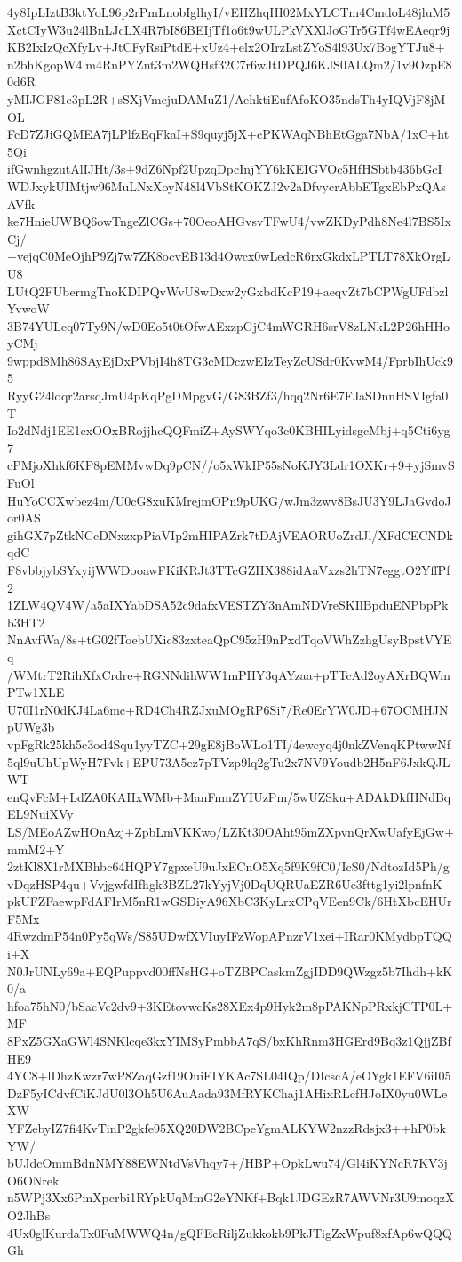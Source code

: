 4y8IpLIztB3ktYoL96p2rPmLnobIglhyI/vEHZhqHI02MxYLCTm4CmdoL48jluM5
XctCIyW3u24lBnLJcLX4R7bI86BEIjTf1o6t9wULPkVXXlJoGTr5GTf4wEAeqr9j
KB2IxIzQcXfyLv+JtCFyRsiPtdE+xUz4+elx2OIrzLstZYoS4l93Ux7BogYTJu8+
n2bhKgopW4lm4RnPYZnt3m2WQHsf32C7r6wJtDPQJ6KJS0ALQm2/1v9OzpE80d6R
yMIJGF81c3pL2R+sSXjVmejuDAMuZ1/AehktiEufAfoKO35ndsTh4yIQVjF8jMOL
FcD7ZJiGQMEA7jLPlfzEqFkaI+S9quyj5jX+cPKWAqNBhEtGga7NbA/1xC+ht5Qi
ifGwnhgzutAlIJHt/3s+9dZ6Npf2UpzqDpcInjYY6kKEIGVOc5HfHSbtb436bGcI
WDJxykUIMtjw96MuLNxXoyN48l4VbStKOKZJ2v2aDfvycrAbbETgxEbPxQAsAVfk
ke7HnieUWBQ6owTngeZlCGs+70OeoAHGvsvTFwU4/vwZKDyPdh8Ne4l7BS5IxCj/
+vejqC0MeOjhP9Zj7w7ZK8ocvEB13d4Owcx0wLedcR6rxGkdxLPTLT78XkOrgLU8
LUtQ2FUbermgTnoKDIPQvWvU8wDxw2yGxbdKcP19+aeqvZt7bCPWgUFdbzlYvwoW
3B74YULcq07Ty9N/wD0Eo5t0tOfwAExzpGjC4mWGRH6srV8zLNkL2P26hHHoyCMj
9wppd8Mh86SAyEjDxPVbjI4h8TG3cMDczwEIzTeyZcUSdr0KvwM4/FprbIhUck95
RyyG24loqr2arsqJmU4pKqPgDMpgvG/G83BZf3/hqq2Nr6E7FJaSDnnHSVIgfa0T
Io2dNdj1EE1cxOOxBRojjhcQQFmiZ+AySWYqo3c0KBHILyidsgcMbj+q5Cti6yg7
cPMjoXhkf6KP8pEMMvwDq9pCN//o5xWkIP55sNoKJY3Ldr1OXKr+9+yjSmvSFuOl
HuYoCCXwbez4m/U0cG8xuKMrejmOPn9pUKG/wJm3zwv8BsJU3Y9LJaGvdoJor0AS
gihGX7pZtkNCcDNxzxpPiaVIp2mHIPAZrk7tDAjVEAORUoZrdJl/XFdCECNDkqdC
F8vbbjybSYxyijWWDooawFKiKRJt3TTcGZHX388idAaVxzs2hTN7eggtO2YffPf2
1ZLW4QV4W/a5aIXYabDSA52c9dafxVESTZY3nAmNDVreSKIlBpduENPbpPkb3HT2
NnAvfWa/8s+tG02fToebUXic83zxteaQpC95zH9nPxdTqoVWhZzhgUsyBpstVYEq
/WMtrT2RihXfxCrdre+RGNNdihWW1mPHY3qAYzaa+pTTcAd2oyAXrBQWmPTw1XLE
U70I1rN0dKJ4La6mc+RD4Ch4RZJxuMOgRP6Si7/Re0ErYW0JD+67OCMHJNpUWg3b
vpFgRk25kh5c3od4Squ1yyTZC+29gE8jBoWLo1TI/4ewcyq4j0nkZVenqKPtwwNf
5ql9uUhUpWyH7Fvk+EPU73A5ez7pTVzp9lq2gTu2x7NV9Youdb2H5nF6JxkQJLWT
enQvFcM+LdZA0KAHxWMb+ManFnmZYIUzPm/5wUZSku+ADAkDkfHNdBqEL9NuiXVy
LS/MEoAZwHOnAzj+ZpbLmVKKwo/LZKt30OAht95mZXpvnQrXwUafyEjGw+mmM2+Y
2ztKl8X1rMXBhbc64HQPY7gpxeU9uJxECnO5Xq5f9K9fC0/IcS0/NdtozId5Ph/g
vDqzHSP4qu+VvjgwfdIfhgk3BZL27kYyjVj0DqUQRUaEZR6Ue3fttg1yi2lpnfnK
pkUFZFaewpFdAFIrM5nR1wGSDiyA96XbC3KyLrxCPqVEen9Ck/6HtXbcEHUrF5Mx
4RwzdmP54n0Py5qWs/S85UDwfXVIuyIFzWopAPnzrV1xei+IRar0KMydbpTQQi+X
N0JrUNLy69a+EQPuppvd00ffNsHG+oTZBPCaskmZgjIDD9QWzgz5b7Ihdh+kK0/a
hfoa75hN0/bSacVc2dv9+3KEtovwcKs28XEx4p9Hyk2m8pPAKNpPRxkjCTP0L+MF
8PxZ5GXaGWl4SNKlcqe3kxYIMSyPmbbA7qS/bxKhRnm3HGErd9Bq3z1QjjZBfHE9
4YC8+lDhzKwzr7wP8ZaqGzf19OuiEIYKAc7SL04IQp/DIcscA/eOYgk1EFV6iI05
DzF5yICdvfCiKJdU0l3Oh5U6AuAada93MfRYKChaj1AHixRLcfHJoIX0yu0WLeXW
YFZebyIZ7fi4KvTinP2gkfe95XQ20DW2BCpeYgmALKYW2nzzRdsjx3++hP0bkYW/
bUJdcOmmBdnNMY88EWNtdVsVhqy7+/HBP+OpkLwu74/Gl4iKYNcR7KV3jO6ONrek
n5WPj3Xx6PmXpcrbi1RYpkUqMmG2eYNKf+Bqk1JDGEzR7AWVNr3U9moqzXO2JhBs
4Ux0glKurdaTx0FuMWWQ4n/gQFEcRiljZukkokb9PkJTigZxWpuf8xfAp6wQQQGh
